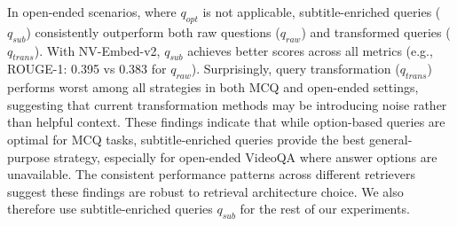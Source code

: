 In open-ended scenarios, where $q_{opt}$ is not applicable, subtitle-enriched queries ($q_{sub}$) consistently outperform both raw questions ($q_{raw}$) and transformed queries ($q_{trans}$). With NV-Embed-v2, $q_{sub}$ achieves better scores across all metrics (e.g., ROUGE-1: 0.395 vs 0.383 for $q_{raw}$). Surprisingly, query transformation ($q_{trans}$) performs worst among all strategies in both MCQ and open-ended settings, suggesting that current transformation methods may be introducing noise rather than helpful context.
These findings indicate that while option-based queries are optimal for MCQ tasks, subtitle-enriched queries provide the best general-purpose strategy, especially for open-ended VideoQA where answer options are unavailable. The consistent performance patterns across different retrievers suggest these findings are robust to retrieval architecture choice. We also therefore use subtitle-enriched queries $q_{sub}$ for the rest of our experiments.





















